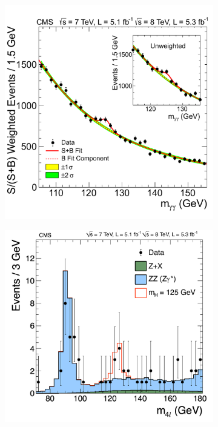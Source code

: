 \begin{figure}[htbp]
  \centering
  \begin{subfigure}[htbp]{0.48\textwidth}
    \centering
    \includegraphics[width=\textwidth]{figures_and_tables/theory/higgs_discovery_hgg.pdf}
    \caption{}
    \label{higgs_discovery_hgg}
  \end{subfigure}
  \hfill
  \begin{subfigure}[htbp]{0.48\textwidth}
    \centering
    \includegraphics[width=\textwidth]{figures_and_tables/theory/higgs_discovery_hzz4l.pdf}

\end{subfigure}
\end{figure}
